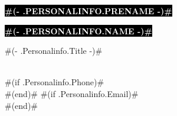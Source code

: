 \documentclass[10pt]{developercv} %
\begin{document}

\begin{minipage}[t]{0.45\textwidth} %
	\vspace{-\baselineskip} %
	
	\colorbox{black}{{\HUGE\textcolor{white}{\textbf{\MakeUppercase{ #(- .Personalinfo.Prename -)# }}}}} %
	
	\colorbox{black}{{\HUGE\textcolor{white}{\textbf{\MakeUppercase{ #(- .Personalinfo.Name -)# }}}}} %
	
	\vspace{6pt}
	
	{\huge { #(- .Personalinfo.Title -)# } } %
\end{minipage}
\begin{minipage}[t]{0.275\textwidth} %
	\vspace{-\baselineskip} %
	
	\\
	#(if .Personalinfo.Phone)#\\#(end)#
	#(if .Personalinfo.Email)#\\#(end)#
\end{minipage}
\end{document}
